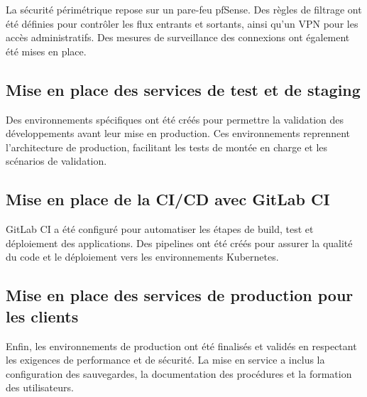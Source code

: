 La sécurité périmétrique repose sur un pare-feu pfSense. Des règles de filtrage ont été définies pour contrôler les flux entrants et sortants, ainsi qu’un VPN pour les accès administratifs. Des mesures de surveillance des connexions ont également été mises en place.

\subsection{Mise en place des services de test et de staging}

Des environnements spécifiques ont été créés pour permettre la validation des développements avant leur mise en production. Ces environnements reprennent l’architecture de production, facilitant les tests de montée en charge et les scénarios de validation.

\subsection{Mise en place de la CI/CD avec GitLab CI}

GitLab CI a été configuré pour automatiser les étapes de build, test et déploiement des applications. Des pipelines ont été créés pour assurer la qualité du code et le déploiement vers les environnements Kubernetes.

\subsection{Mise en place des services de production pour les clients}

Enfin, les environnements de production ont été finalisés et validés en respectant les exigences de performance et de sécurité. La mise en service a inclus la configuration des sauvegardes, la documentation des procédures et la formation des utilisateurs.

